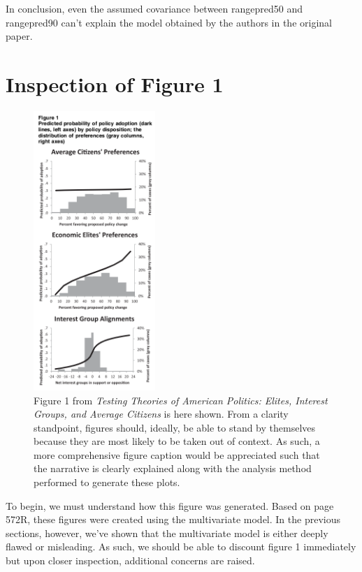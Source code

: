 \documentclass[]{article}
\begin{document}
In conclusion, even the assumed covariance between rangepred50 and rangepred90 can't explain the model obtained by the authors in the original paper. 

\section{Inspection of Figure 1}

\begin{figure}[H]
	\begin{center}
		\includegraphics[height=400px]{./figures/figure1.png}
	\end{center}	
	\caption{Figure 1 from \textit{Testing Theories of American Politics: Elites, Interest Groups, and Average Citizens} is here shown. From a clarity standpoint, figures should, ideally, be able to stand by themselves because they are most likely to be taken out of context. As such, a more comprehensive figure caption would be appreciated such that the narrative is clearly explained along with the analysis method performed to generate these plots.}
	\label{paper_figure1}
\end{figure}

To begin, we must understand how this figure was generated.
Based on page 572R, these figures were created using the multivariate model.
In the previous sections, however, we've shown that the multivariate model is either deeply flawed or misleading.
As such, we should be able to discount figure 1 immediately but upon closer inspection, additional concerns are raised.
\end{document}

